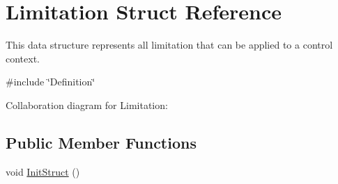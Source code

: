 \hypertarget{struct_limitation}{}\section{Limitation Struct Reference}
\label{struct_limitation}


This data structure represents all limitation that can be applied to a control context.  




{\ttfamily \#include \char`\"{}Definition\char`\"{}}



Collaboration diagram for Limitation\+:
\subsection*{Public Member Functions}
\begin{DoxyCompactItemize}
\item 
void \hyperlink{struct_limitation_a098f4ee5d0eb6baf844ff3164f1a20f6}{Init\+Struct} ()
\end{DoxyCompactItemize}
